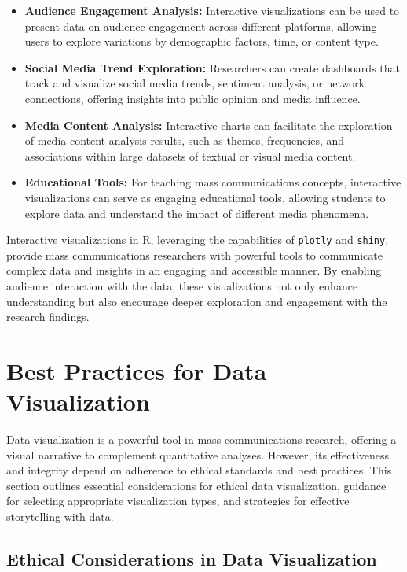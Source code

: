 \documentclass[
]{book}
\begin{document}
\begin{itemize}
\item
  \textbf{Audience Engagement Analysis:} Interactive visualizations can be used to present data on audience engagement across different platforms, allowing users to explore variations by demographic factors, time, or content type.
\item
  \textbf{Social Media Trend Exploration:} Researchers can create dashboards that track and visualize social media trends, sentiment analysis, or network connections, offering insights into public opinion and media influence.
\item
  \textbf{Media Content Analysis:} Interactive charts can facilitate the exploration of media content analysis results, such as themes, frequencies, and associations within large datasets of textual or visual media content.
\item
  \textbf{Educational Tools:} For teaching mass communications concepts, interactive visualizations can serve as engaging educational tools, allowing students to explore data and understand the impact of different media phenomena.
\end{itemize}

Interactive visualizations in R, leveraging the capabilities of \texttt{plotly} and \texttt{shiny}, provide mass communications researchers with powerful tools to communicate complex data and insights in an engaging and accessible manner. By enabling audience interaction with the data, these visualizations not only enhance understanding but also encourage deeper exploration and engagement with the research findings.

\section{Best Practices for Data Visualization}\label{best-practices-for-data-visualization}

Data visualization is a powerful tool in mass communications research, offering a visual narrative to complement quantitative analyses. However, its effectiveness and integrity depend on adherence to ethical standards and best practices. This section outlines essential considerations for ethical data visualization, guidance for selecting appropriate visualization types, and strategies for effective storytelling with data.

\subsection{Ethical Considerations in Data Visualization}\label{ethical-considerations-in-data-visualization}
\end{document}
